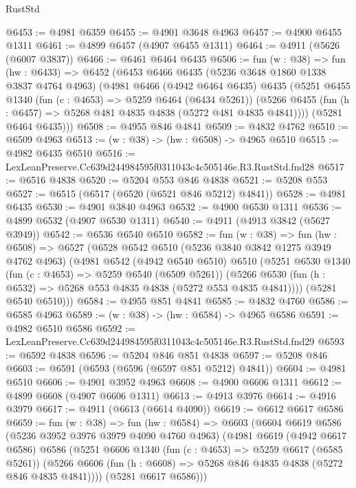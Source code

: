 \begin{lexlean}{RustStd}
\begin{coremodule}
@6453 := @4981 @6359
@6455 := @4901 @3648 @4963
@6457 := @4900 @6455 @1311
@6461 := @4899 @6457 (@4907 @6455 @1311)
@6464 := @4911 (@5626 (@6007 @3837))
@6466 := @6461 @6464 @6435
@6506 := fun (w : @38) =>
  fun (hw : @6433) =>
  @6452
    (@6453
      @6466
      @6435
      (@5236 @3648 @1860 @1338 @3837 @4764 @4963)
      (@4981
        @6466
        (@4942 @6464 @6435)
        @6435
        (@5251
          @6455
          @1340
          (fun (c : @4653) => @5259 @6464 (@6434 @5261))
          (@5266 @6455 (fun (h : @6457) => @5268 @481 @4835 @4838 (@5272 @481 @4835 @4841))))
        (@5281 @6464 @6435)))
@6508 := @4955 @846 @4841
@6509 := @4832 @4762
@6510 := @6509 @4963
@6513 := (w : @38) -> (hw : @6508) -> @4965 @6510
@6515 := @4982 @6435 @6510
@6516 := LexLeanPreserve.Cc639d244984595f0311043c4c505146e.R3.RustStd.fnd28
@6517 := @6516 @4838
@6520 := @5204 @553 @846 @4838
@6521 := @5208 @553
@6527 := @6515 (@6517 (@6520 (@6521 @846 @5212) @4841))
@6528 := @4981 @6435
@6530 := @4901 @3840 @4963
@6532 := @4900 @6530 @1311
@6536 := @4899 @6532 (@4907 @6530 @1311)
@6540 := @4911 (@4913 @3842 (@5627 @3949))
@6542 := @6536 @6540 @6510
@6582 := fun (w : @38) =>
  fun (hw : @6508) =>
  @6527
    (@6528
      @6542
      @6510
      (@5236 @3840 @3842 @1275 @3949 @4762 @4963)
      (@4981
        @6542
        (@4942 @6540 @6510)
        @6510
        (@5251
          @6530
          @1340
          (fun (c : @4653) => @5259 @6540 (@6509 @5261))
          (@5266 @6530 (fun (h : @6532) => @5268 @553 @4835 @4838 (@5272 @553 @4835 @4841))))
        (@5281 @6540 @6510)))
@6584 := @4955 @851 @4841
@6585 := @4832 @4760
@6586 := @6585 @4963
@6589 := (w : @38) -> (hw : @6584) -> @4965 @6586
@6591 := @4982 @6510 @6586
@6592 := LexLeanPreserve.Cc639d244984595f0311043c4c505146e.R3.RustStd.fnd29
@6593 := @6592 @4838
@6596 := @5204 @846 @851 @4838
@6597 := @5208 @846
@6603 := @6591 (@6593 (@6596 (@6597 @851 @5212) @4841))
@6604 := @4981 @6510
@6606 := @4901 @3952 @4963
@6608 := @4900 @6606 @1311
@6612 := @4899 @6608 (@4907 @6606 @1311)
@6613 := @4913 @3976
@6614 := @4916 @3979
@6617 := @4911 (@6613 (@6614 @4090))
@6619 := @6612 @6617 @6586
@6659 := fun (w : @38) =>
  fun (hw : @6584) =>
  @6603
    (@6604
      @6619
      @6586
      (@5236 @3952 @3976 @3979 @4090 @4760 @4963)
      (@4981
        @6619
        (@4942 @6617 @6586)
        @6586
        (@5251
          @6606
          @1340
          (fun (c : @4653) => @5259 @6617 (@6585 @5261))
          (@5266 @6606 (fun (h : @6608) => @5268 @846 @4835 @4838 (@5272 @846 @4835 @4841))))
        (@5281 @6617 @6586)))

\end{coremodule}
\end{lexlean}
